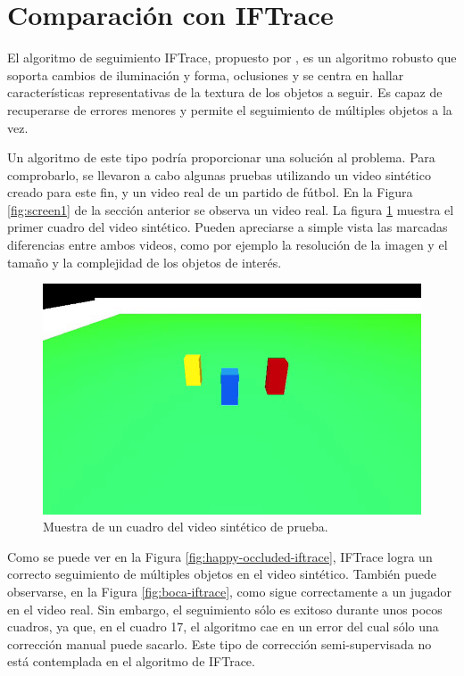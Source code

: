 \section{Comparación con IFTrace}
\label{sec:iftrace}

El algoritmo de seguimiento IFTrace, propuesto por \citeauthor*{IFTrace}, es un
algoritmo robusto que soporta cambios de iluminación y forma, oclusiones y se
centra en hallar características representativas de la textura de los objetos a
seguir. Es capaz de recuperarse de errores menores y permite el seguimiento de
múltiples objetos a la vez.

Un algoritmo de este tipo podría proporcionar una solución al problema. Para
comprobarlo, se llevaron a cabo algunas pruebas utilizando un video sintético
creado para este fin, y un video real de un partido de fútbol. En la Figura
\ref{fig:screen1} de la sección anterior se observa un video real. La figura
\ref{fig:sample-happy-occluded} muestra el primer cuadro del video sintético. Pueden
apreciarse a simple vista las marcadas diferencias entre ambos videos, como por
ejemplo la resolución de la imagen y el tamaño y la complejidad de los objetos
de interés.

\begin{figure}[H]
    \centering
    \includegraphics[width=\linewidth]{./images/sample_happy_occluded.png}
    \caption{Muestra de un cuadro del video sintético de prueba.}
    \label{fig:sample-happy-occluded}
\end{figure}

Como se puede ver en la Figura \ref{fig:happy-occluded-iftrace}, IFTrace logra
un correcto seguimiento de múltiples objetos en el video sintético. También
puede observarse, en la Figura \ref{fig:boca-iftrace}, como sigue correctamente
a un jugador en el video real. Sin embargo, el seguimiento sólo es exitoso
durante unos pocos cuadros, ya que, en el cuadro 17, el algoritmo cae en un
error del cual sólo una corrección manual puede sacarlo. Este tipo de corrección
semi-supervisada no está contemplada en el algoritmo de IFTrace.

